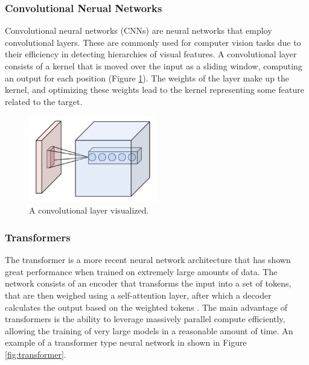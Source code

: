 \documentclass[english, 12pt, a4paper, sci, utf8, a-2b, online]{aaltothesis}
\begin{document}
\subsubsection{Convolutional Nerual Networks}

Convolutional neural networks (CNNs) are neural networks that employ convolutional layers. These are commonly used for computer vision tasks due to their efficiency in detecting hierarchies of visual features. A convolutional layer consists of a kernel that is moved over the input as a sliding window, computing an output for each position (Figure \ref{fig:convolutional}). The weights of the layer make up the kernel, and optimizing these weights lead to the kernel representing some feature related to the target. \cite{cnn}

\begin{figure}[h]
    \centering
    \includegraphics[width=0.5\textwidth]{figures/convolutional-layer.png}
    \caption{A convolutional layer visualized. \cite{convolutional-layer}}
    \label{fig:convolutional}
\end{figure}

\subsubsection{Transformers}

The transformer is a more recent neural network architecture that has shown great performance when trained on extremely large amounts of data. The network consists of an encoder that transforms the input into a set of tokens, that are then weighed using a self-attention layer, after which a decoder calculates the output based on the weighted tokens \cite{attention-is-all-you-need}. The main advantage of transformers is the ability to leverage massively parallel compute efficiently, allowing the training of very large models in a reasonable amount of time. An example of a transformer type neural network in shown in Figure \ref{fig:transformer}.
\end{document}
